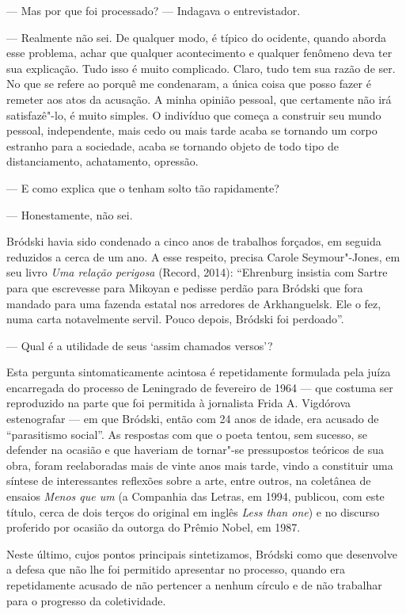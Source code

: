 --- Mas por que foi processado? --- Indagava o entrevistador.

--- Realmente não sei. De qualquer modo, é típico do ocidente, quando
aborda esse problema, achar que qualquer acontecimento e qualquer
fenômeno deva ter sua explicação. Tudo isso é muito complicado. Claro,
tudo tem sua razão de ser. No que se refere ao porquê me condenaram, a
única coisa que posso fazer é remeter aos atos da acusação. A minha
opinião pessoal, que certamente não irá satisfazê"-lo, é muito simples. O
indivíduo que começa a construir seu mundo pessoal, independente, mais
cedo ou mais tarde acaba se tornando um corpo estranho para a sociedade,
acaba se tornando objeto de todo tipo de distanciamento, achatamento,
opressão.

--- E como explica que o tenham solto tão rapidamente?

--- Honestamente, não sei.

Bródski havia sido condenado a cinco anos de trabalhos forçados, em
seguida reduzidos a cerca de um ano. A esse respeito, precisa Carole
Seymour"-Jones, em seu livro \emph{Uma relação perigosa} (Record, 2014): ``Ehrenburg
insistia com Sartre para que escrevesse para Mikoyan e pedisse perdão
para Bródski que fora mandado para uma fazenda estatal nos arredores de
Arkhanguelsk. Ele o fez, numa carta notavelmente servil. Pouco depois,
Bródski foi perdoado''.

--- Qual é a utilidade de seus `assim chamados versos'?

Esta pergunta sintomaticamente acintosa é repetidamente formulada pela
juíza encarregada do processo de Leningrado de fevereiro de 1964 ---
que costuma ser reproduzido na parte que foi permitida à jornalista Frida A.
Vigdórova estenografar --- em que Bródski, então com 24 anos de idade,
era acusado de ``parasitismo social''. As respostas com que o poeta
tentou, sem sucesso, se defender na ocasião e que haveriam de tornar"-se
pressupostos teóricos de sua obra, foram reelaboradas mais de vinte anos
mais tarde, vindo a constituir uma síntese de interessantes reflexões
sobre a arte, entre outros, na coletânea de ensaios \emph{Menos que um}
(a Companhia das Letras, em 1994, publicou, com este título, cerca de
dois terços do original em inglês \emph{Less than one}) e no
discurso proferido por ocasião da outorga do Prêmio Nobel, em 1987.

Neste último, cujos pontos principais sintetizamos, Bródski como que
desenvolve a defesa que não lhe foi permitido apresentar no processo,
quando era repetidamente acusado de não pertencer a nenhum círculo e de
não trabalhar para o progresso da coletividade.

